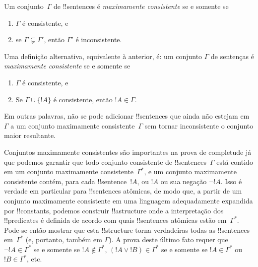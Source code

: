 \documentclass[../../../include/open-logic-section]{subfiles}
\begin{document}

\begin{defn}
Um conjunto~$\Gamma$ de !!{sentence}s é \emph{maximamente consistente} se e somente se
\begin{enumerate}
\item $\Gamma$ é consistente, e
\item se $\Gamma \subsetneq \Gamma'$, então $\Gamma'$ é inconsistente.
\end{enumerate}
\end{defn}

\begin{explain}
Uma definição alternativa, equivalente à anterior, é: um conjunto $\Gamma$ de
sentenças é \emph{maximamente consistente} se e somente se
\begin{enumerate}
\item $\Gamma$ é consistente, e
\item Se $\Gamma \cup \{ !A \}$ é consistente, então $!A \in \Gamma$.
\end{enumerate}
Em outras palavras, não se pode adicionar !!{sentence}s que ainda não estejam em~$\Gamma$
a um conjunto maximamente consistente~$\Gamma$ sem tornar inconsistente o
conjunto maior resultante.
\end{explain}

\begin{explain}
Conjuntos maximamente consistentes são importantes na prova de completude
já que podemos garantir que todo conjunto consistente de !!{sentence}s~$\Gamma$
está contido em um conjunto maximamente consistente~$\Gamma^*$, e um conjunto maximamente
consistente contém, para cada !!{sentence}~$!A$, ou $!A$ ou sua
negação $\lnot !A$. Isso é verdade em particular para !!{sentence}s atômicas,
de modo que, a partir de um conjunto maximamente consistente em uma linguagem adequadamente expandida por
!!{constant}s, podemos construir !!a{structure} onde a
interpretação dos !!{predicate}s é definida de acordo com quais !!{sentence}s
atômicas estão em~$\Gamma^*$. Pode-se então mostrar que esta !!{structure}
torna verdadeiras todas as !!{sentence}s em~$\Gamma^*$ (e, portanto, também em $\Gamma$).
A prova deste último fato requer que $\lnot !A \in
\Gamma^*$ se e somente se $!A \notin \Gamma^*$, $(!A \lor !B) \in \Gamma^*$ se e somente se $!A
\in \Gamma^*$ ou $!B \in \Gamma^*$, etc.
\end{explain}
\end{document}
